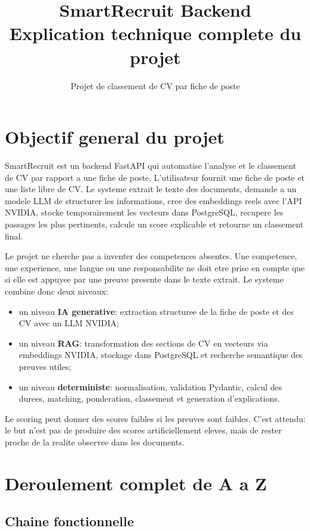 \documentclass[12pt,a4paper]{article}
\title{\textbf{SmartRecruit Backend}\\Explication technique complete du projet}
\author{Projet de classement de CV par fiche de poste}
\date{}
\begin{document}
\maketitle
\tableofcontents
\newpage

\section{Objectif general du projet}

SmartRecruit est un backend FastAPI qui automatise l'analyse et le classement de CV par rapport a une fiche de poste. L'utilisateur fournit une fiche de poste et une liste libre de CV. Le systeme extrait le texte des documents, demande a un modele LLM de structurer les informations, cree des embeddings reels avec l'API NVIDIA, stocke temporairement les vecteurs dans PostgreSQL, recupere les passages les plus pertinents, calcule un score explicable et retourne un classement final.

Le projet ne cherche pas a inventer des competences absentes. Une competence, une experience, une langue ou une responsabilite ne doit etre prise en compte que si elle est appuyee par une preuve presente dans le texte extrait. Le systeme combine donc deux niveaux:

\begin{itemize}
  \item un niveau \textbf{IA generative}: extraction structuree de la fiche de poste et des CV avec un LLM NVIDIA;
  \item un niveau \textbf{RAG}: transformation des sections de CV en vecteurs via embeddings NVIDIA, stockage dans PostgreSQL et recherche semantique des preuves utiles;
  \item un niveau \textbf{deterministe}: normalisation, validation Pydantic, calcul des durees, matching, ponderation, classement et generation d'explications.
\end{itemize}

Le scoring peut donner des scores faibles si les preuves sont faibles. C'est attendu: le but n'est pas de produire des scores artificiellement eleves, mais de rester proche de la realite observee dans les documents.

\section{Deroulement complet de A a Z}

\subsection{Chaine fonctionnelle}
\end{document}
